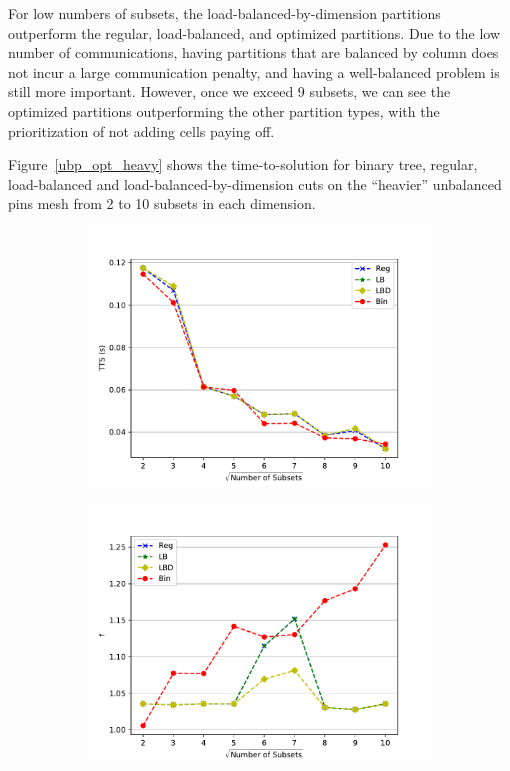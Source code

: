 \documentclass[times,final]{elsarticle}
\begin{document}
For low numbers of subsets, the load-balanced-by-dimension partitions outperform the regular, load-balanced, and optimized partitions.
Due to the low number of communications, having partitions that are balanced by column does not incur a large communication penalty, and having a well-balanced problem is still more important.
However, once we exceed 9 subsets, we can see the optimized partitions outperforming the other partition types, with the prioritization of not adding cells paying off.

Figure~\ref{ubp_opt_heavy} shows the time-to-solution for binary tree, regular, load-balanced and load-balanced-by-dimension cuts on the ``heavier'' unbalanced pins mesh from 2 to 10 subsets in each dimension.
\begin{figure}[h]
\centering
  \begin{subfigure}[t]{0.49\textwidth}
    \centering
     \includegraphics[scale=0.55]{../figures/more_sparse_best_comp.pdf}
  \end{subfigure}
  \begin{subfigure}[t]{0.49\textwidth}
    \centering
    \includegraphics[scale=0.55]{../figures/more_sparse_metric_comp.pdf}

\end{subfigure}
\end{figure}
\end{document}
